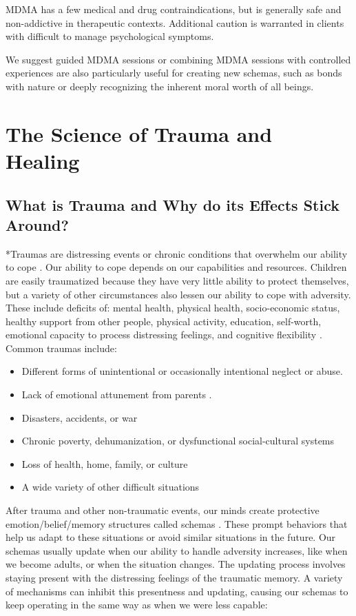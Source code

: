 \documentclass[12pt,letterpaper]{article}
\begin{document}
MDMA has a few medical and drug contraindications, but is generally safe and non-addictive in therapeutic contexts. Additional caution is warranted in clients with difficult to manage psychological symptoms. 

We suggest guided MDMA sessions or combining MDMA sessions with controlled experiences are also particularly useful for creating new schemas, such as bonds with nature or deeply recognizing the inherent moral worth of all beings. 
\section{The Science of Trauma and Healing}
\subsection{What is Trauma and Why do its Effects Stick Around?}
*Traumas are distressing events or chronic conditions that overwhelm our ability to cope \cite{laneReconsolidation}. Our ability to cope depends on our capabilities and resources. Children are easily traumatized because they have very little ability to protect themselves, but a variety of other circumstances also lessen our ability to cope with adversity.  These include deficits of: mental health, physical health, socio-economic status, healthy support from other people, physical activity, education, self-worth, emotional capacity to process distressing feelings, and cognitive flexibility \cite{sayedRiskFactors,tangRiskFactors,trickeyRiskFactors}. Common traumas include:
\begin{itemize}
    \item Different forms of unintentional or occasionally intentional neglect or abuse.
    \item Lack of emotional attunement from parents \cite{brownAttachmentDisturbances}.
    \item Disasters, accidents, or war
    \item Chronic poverty, dehumanization, or dysfunctional social-cultural systems \cite{roncaStructuralViolence}
    \item Loss of health, home, family, or culture
    \item A wide variety of other difficult situations
\end{itemize}
After trauma and other non-traumatic events, our minds create protective emotion/belief/memory structures called schemas \cite{eckerUnlocking}. These prompt behaviors that help us adapt to these situations or avoid similar situations in the future. Our schemas usually update when our ability to handle adversity increases, like when we become adults, or when the situation changes. The updating process involves staying present with the distressing feelings of the traumatic memory. A variety of mechanisms can inhibit this presentness and updating, causing our schemas to keep operating in the same way as when we were less capable:
\end{document}
